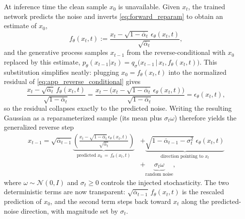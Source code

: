 At inference time the clean sample $x_0$ is unavailable. Given $x_t$, the trained network predicts the noise and inverts \autoref{eq:forward_reparam} to obtain an estimate of $x_0$,
\begin{equation}
\label{eq:app_predicted_x0}
    f_\theta(x_t, t) := \frac{x_t - \sqrt{1-\overline{\alpha}_t}\,\epsilon_\theta(x_t, t)}{\sqrt{\overline{\alpha}_t}},
\end{equation}
and the generative process samples $x_{t-1}$ from the reverse-conditional with $x_0$ replaced by this estimate, $p_\theta(x_{t-1}|x_t) = q_\sigma\big(x_{t-1} \,\big|\, x_t, f_\theta(x_t,t)\big)$. This substitution simplifies neatly: plugging $x_0 = f_\theta(x_t,t)$ into the normalized residual of \autoref{eq:app_reverse_conditional} gives
\begin{equation}
\label{eq:app_residual_collapse}
    \frac{x_t - \sqrt{\overline{\alpha}_t}\,f_\theta(x_t,t)}{\sqrt{1-\overline{\alpha}_t}}
    = \frac{x_t - \big(x_t - \sqrt{1-\overline{\alpha}_t}\,\epsilon_\theta(x_t,t)\big)}{\sqrt{1-\overline{\alpha}_t}}
    = \epsilon_\theta(x_t, t),
\end{equation}
so the residual collapses exactly to the predicted noise. Writing the resulting Gaussian as a reparameterized sample (its mean plus $\sigma_t\omega$) therefore yields the generalized reverse step
\begin{equation}
\label{eq:app_generalized_sampling}
\begin{aligned}
    x_{t-1} = \sqrt{\overline{\alpha}_{t-1}} \underbrace{\left( \frac{x_t - \sqrt{1-\overline{\alpha}_t}\,\epsilon_\theta(x_t, t)}{\sqrt{\overline{\alpha}_t}} \right)}_{\text{predicted } x_0 \,=\, f_\theta(x_t,t)}
    &+ \underbrace{\sqrt{1 - \overline{\alpha}_{t-1} - \sigma_t^2}\; \epsilon_\theta(x_t, t)}_{\text{direction pointing to } x_t} \\
    &+ \underbrace{\sigma_t \omega}_{\text{random noise}},
\end{aligned}
\end{equation}
where $\omega \sim \mathcal{N}(0, I)$ and $\sigma_t \ge 0$ controls the injected stochasticity. The two deterministic terms are now transparent: $\sqrt{\overline{\alpha}_{t-1}}\,f_\theta(x_t,t)$ is the rescaled prediction of $x_0$, and the second term steps back toward $x_t$ along the predicted-noise direction, with magnitude set by $\sigma_t$.

